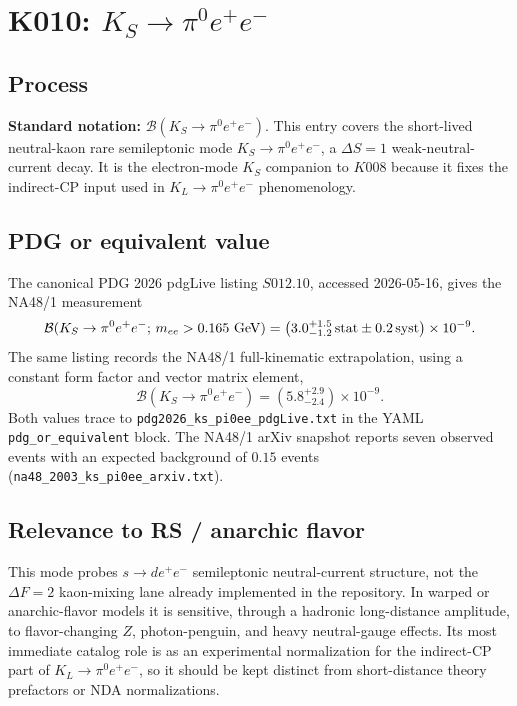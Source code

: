 
\section{K010: \(K_S \to \pi^0 e^+e^-\)}

\subsection*{Process}
\textbf{Standard notation:} \(\mathcal{B}(K_S\to\pi^0 e^+e^-)\).
This entry covers the short-lived neutral-kaon rare semileptonic mode
\(K_S\to\pi^0 e^+e^-\), a \(\Delta S=1\) weak-neutral-current decay.  It is
the electron-mode \(K_S\) companion to
\(K008\) because it fixes the indirect-CP input used in \(K_L\to\pi^0 e^+e^-\)
phenomenology.

\subsection*{PDG or equivalent value}
The canonical PDG 2026 pdgLive listing \(S012.10\), accessed 2026-05-16, gives
the NA48/1 measurement
\[
  \mathcal{B}(K_S\to\pi^0 e^+e^-;\,m_{ee}>0.165~{\rm GeV})
  = \left(3.0^{+1.5}_{-1.2}\,{\rm stat}\pm0.2\,{\rm syst}\right)
    \times10^{-9}.
\]
The same listing records the NA48/1 full-kinematic extrapolation, using a
constant form factor and vector matrix element,
\[
  \mathcal{B}(K_S\to\pi^0 e^+e^-)
  = \left(5.8^{+2.9}_{-2.4}\right)\times10^{-9}.
\]
Both values trace to \texttt{pdg2026\_ks\_pi0ee\_pdgLive.txt} in the YAML
\texttt{pdg\_or\_equivalent} block.  The NA48/1 arXiv snapshot reports seven
observed events with an expected background of \(0.15\) events
(\texttt{na48\_2003\_ks\_pi0ee\_arxiv.txt}).

\subsection*{Relevance to RS / anarchic flavor}
This mode probes \(s\to d e^+e^-\) semileptonic neutral-current structure,
not the \(\Delta F=2\) kaon-mixing lane already implemented in the repository.
In warped or anarchic-flavor models it is sensitive, through a hadronic
long-distance amplitude, to flavor-changing \(Z\), photon-penguin, and heavy
neutral-gauge effects.  Its most immediate catalog role is as an experimental
normalization for the indirect-CP part of \(K_L\to\pi^0 e^+e^-\), so it should
be kept distinct from short-distance theory prefactors or NDA normalizations.

